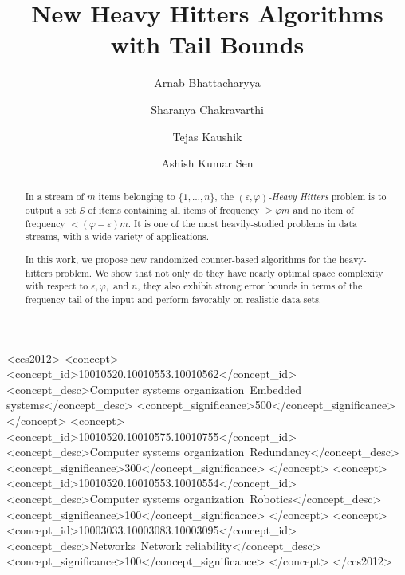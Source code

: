 \documentclass[sigconf,review=true,anonymous=true,screen]{acmart}
\newcommand{\eps}{\varepsilon}
\renewcommand{\phi}{\varphi}
\begin{document}
%
\title{New Heavy Hitters Algorithms with Tail Bounds}

%
\author{Arnab Bhattacharyya}
\author{Sharanya Chakravarthi}
\author{Tejas Kaushik}
\author{Ashish Kumar Sen}
%
\renewcommand{\shortauthors}{Bhattacharyya et al.}

%
\begin{abstract}
In a stream of $m$ items belonging to $\{1, \dots, n\}$, the {\em $(\eps, \phi)$-Heavy Hitters} problem is to output a set $S$ of items containing all items of frequency $\geq \phi m$ and no item of frequency $< (\phi-\eps)m$. It is one of the most heavily-studied problems in data streams, with a wide variety of applications. 

In this work, we propose new randomized counter-based algorithms for the heavy-hitters problem. We show that not only do they have nearly optimal space complexity with respect to $\eps, \phi,$ and $n$, they also exhibit strong error bounds in terms of the frequency tail of the input and perform favorably on realistic data sets.
\end{abstract}

%
%
\begin{CCSXML}
<ccs2012>
 <concept>
  <concept_id>10010520.10010553.10010562</concept_id>
  <concept_desc>Computer systems organization~Embedded systems</concept_desc>
  <concept_significance>500</concept_significance>
 </concept>
 <concept>
  <concept_id>10010520.10010575.10010755</concept_id>
  <concept_desc>Computer systems organization~Redundancy</concept_desc>
  <concept_significance>300</concept_significance>
 </concept>
 <concept>
  <concept_id>10010520.10010553.10010554</concept_id>
  <concept_desc>Computer systems organization~Robotics</concept_desc>
  <concept_significance>100</concept_significance>
 </concept>
 <concept>
  <concept_id>10003033.10003083.10003095</concept_id>
  <concept_desc>Networks~Network reliability</concept_desc>
  <concept_significance>100</concept_significance>
 </concept>
</ccs2012>
\end{CCSXML}
\end{document}
